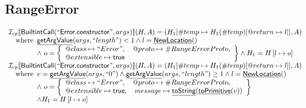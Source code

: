 \documentclass{article}
\makeatletter
\newcommand{\SF}[1]{\mbox{\textsf{#1}}}
\newcommand{\wherec}[1]{{\rm where}\begin{array}[t]{l}#1\end{array}}
\newcommand{\I}{\mathcal{I}}
\newcommand{\set}[1]{\left\{\begin{array}{l}#1\end{array}\right\}}
\newcommand{\lbr}{\llbracket}
\newcommand{\rbr}{\rrbracket}
\newcommand{\hf}[1]{\underline{\sf #1}}
\newcommand{\varprop}[1]{@#1}
\newcommand{\vtrue}{\SF{true}}
\makeatother
\begin{document}
\subsection{RangeError}
\[
\begin{array}{l}
\I _{cp}\lbr \SF{BuiltintCall}(``\SF{Error.constructor}",args)\rbr(H,A)
  = (H_1[\#temp \mapsto H_1(\#temp)[@return \mapsto l]], A)\\
\quad\wherec{
  \hf{getArgValue}(args, ``length") < 1 
  \land l=\hf{NewLocation}()\\
  \land\ o = \set{
    \varprop{class}\mapsto ``Error", \quad
    \varprop{proto}\mapsto \#RangeErrorProto,\\
    \varprop{extensible}\mapsto \vtrue
    }
  \land H_1=H\left[l\mapsto o\right]\\
  }\\
  
\I _{cp}\lbr \SF{BuiltintCall}(``\SF{Error.constructor}",args)\rbr(H,A)
  = (H_1[\#temp \mapsto H_1(\#temp)[@return \mapsto l]], A)\\
\quad\wherec{
  v = \hf{getArgValue}(args, ``0") \land \hf{getArgValue}(args, ``length") \geq 1
  \land l=\hf{NewLocation}()\\
  \land\ o = \set{
    \varprop{class}\mapsto ``Error", \quad
    \varprop{proto}\mapsto \#RangeErrorProto,\\
    \varprop{extensible}\mapsto \vtrue,  \quad
    message \mapsto \hf{toString}(\hf{toPrimitive}(v)) 
    }\\
  \land H_1=H\left[l\mapsto o\right]
  }\\

\end{array}
\]
\end{document}
